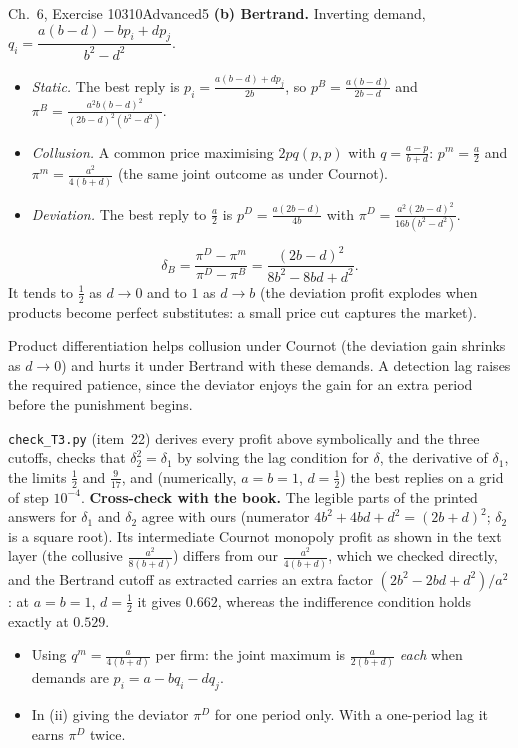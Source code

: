\begin{exsol}{\MG{} Ch.~6, Exercise 10}{310}{Advanced}{5}
\textbf{(b) Bertrand.} Inverting demand, $q_i = \dfrac{a(b-d) - bp_i + dp_j}{b^2 - d^2}$.
\begin{itemize}
  \item \emph{Static.} The best reply is $p_i = \frac{a(b-d) + dp_j}{2b}$, so $p^B = \frac{a(b-d)}{2b-d}$ and
  $\pi^B = \frac{a^2 b (b-d)^2}{(2b-d)^2(b^2-d^2)}$.
  \item \emph{Collusion.} A common price maximising $2pq(p,p)$ with $q = \frac{a-p}{b+d}$: $p^m = \frac a2$ and
  $\pi^m = \frac{a^2}{4(b+d)}$ (the same joint outcome as under Cournot).
  \item \emph{Deviation.} The best reply to $\frac a2$ is $p^D = \frac{a(2b-d)}{4b}$ with
  $\pi^D = \frac{a^2(2b-d)^2}{16b(b^2-d^2)}$.
\end{itemize}
\[
  \delta_B = \frac{\pi^D - \pi^m}{\pi^D - \pi^B} = \frac{(2b-d)^2}{8b^2 - 8bd + d^2} .
\]
It tends to $\frac12$ as $d \to 0$ and to $1$ as $d \to b$ (the deviation profit explodes when products become
perfect substitutes: a small price cut captures the market).

\interp Product differentiation helps collusion under Cournot (the deviation gain shrinks as $d \to 0$) and hurts
it under Bertrand with these demands. A detection lag raises the required patience, since the deviator
enjoys the gain for an extra period before the punishment begins.

\verify \texttt{check\_T3.py} (item~22) derives every profit above symbolically and the three cutoffs, checks that
$\delta_2^2 = \delta_1$ by solving the lag condition for $\delta$, the derivative of $\delta_1$, the limits
$\frac12$ and $\frac9{17}$, and (numerically, $a = b = 1$, $d = \frac12$) the best replies on a grid of step
$10^{-4}$. \textbf{Cross-check with the book.} The legible parts of the printed answers for $\delta_1$ and $\delta_2$ agree with
ours (numerator $4b^2 + 4bd + d^2 = (2b+d)^2$; $\delta_2$ is a square root). Its intermediate Cournot monopoly profit
as shown in the text layer (the collusive $\frac{a^2}{8(b+d)}$) differs from our $\frac{a^2}{4(b+d)}$, which we
checked directly, and the Bertrand cutoff as extracted carries an extra factor $(2b^2 - 2bd + d^2)/a^2$: at $a = b = 1$,
$d = \frac12$ it gives $0.662$, whereas the indifference condition holds exactly at $0.529$.

\mistakes
\begin{itemize}
  \item Using $q^m = \frac{a}{4(b+d)}$ per firm: the joint maximum is $\frac{a}{2(b+d)}$ \emph{each} when demands are
  $p_i = a - bq_i - dq_j$.
  \item In (ii) giving the deviator $\pi^D$ for one period only. With a one-period lag it earns $\pi^D$ twice.
\end{itemize}

\end{exsol}
